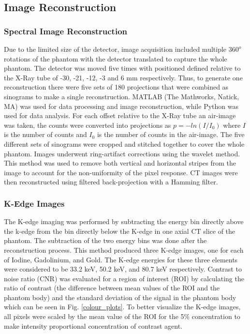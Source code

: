 \documentclass[journal, a4paper]{IEEEtran}
\begin{document}
\subsection{Image Reconstruction}

\subsubsection{Spectral Image Reconstruction}

Due to the limited size of the detector, image acquisition included multiple $360^o$ rotations of the phantom with the detector translated to capture the whole phantom. The detector was moved five times with positioned defined relative to the X-Ray tube of -30, -21, -12, -3 and 6 mm respectively. Thus, to generate one reconstruction there were five sets of 180 projections that were combined as sinograms to make a single reconstruction.
MATLAB (The Mathworks, Natick, MA) was used for data processing and image reconstruction, while Python was used for data analysis. For each offset relative to the X-Ray tube an air-image was taken, the counts were converted into projections as $p = -ln(I/I_0)$ where $I$ is the number of counts and $I_0$ is the number of counts in the air-image. The five different sets of sinograms were cropped and stitched together to cover the whole phantom. 
Images underwent ring-artifact corrections using the wavelet method\cite{munch2009stripe}. This method was used to remove both vertical and horizontal stripes from the image to account for the non-uniformity of the pixel response. CT images were then reconstructed using filtered back-projection with a Hamming filter. 

\subsubsection{K-Edge Images}

The K-edge imaging was performed by subtracting the energy bin directly above the k-edge from the bin directly below the K-edge in one axial CT slice of the phantom. The subtraction of the two energy bins was done after the reconstruction process. This method produced three K-edge images, one for each of Iodine, Gadolinium, and Gold. The K-edge energies for these three elements were considered to be 33.2 keV, 50.2 keV, and 80.7 keV  respectively. Contrast to noise ratio (CNR) was evaluated for a region of interest (ROI) by calculating the ratio of contrast (the difference between mean values of the ROI and the phantom body) and the standard deviation of the signal in the phantom body which can be seen in Fig. \ref{colour_plots}. To better visualize the K-edge images, all pixels were scaled by the mean value of the ROI for the 5\% concentration to make intensity proportional concentration of contrast agent.
\end{document}
